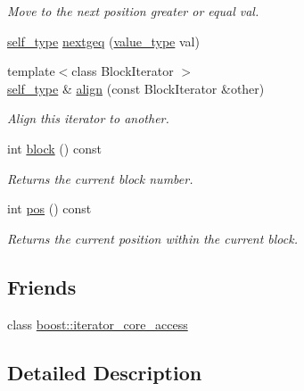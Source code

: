 \begin{DoxyCompactItemize}
\begin{DoxyCompactList}\small\item\em Move to the next position greater or equal {\ttfamily val}. \end{DoxyCompactList}\item 
\mbox{\hyperlink{classirk_1_1index_1_1block__iterator_a338ee8fee726492e9f8bbad4b4d75766}{self\+\_\+type}} \mbox{\hyperlink{classirk_1_1index_1_1block__iterator_aff7b154913783f7984e50c11efa10cb1}{nextgeq}} (\mbox{\hyperlink{classirk_1_1index_1_1block__iterator_a4d6c5b58cedd871e8a8f235e425e8587}{value\+\_\+type}} val)
\item 
{\footnotesize template$<$class Block\+Iterator $>$ }\\\mbox{\hyperlink{classirk_1_1index_1_1block__iterator_a338ee8fee726492e9f8bbad4b4d75766}{self\+\_\+type}} \& \mbox{\hyperlink{classirk_1_1index_1_1block__iterator_a901a557c429c737587e30b123bfc1641}{align}} (const Block\+Iterator \&other)
\begin{DoxyCompactList}\small\item\em Align this iterator to another. \end{DoxyCompactList}\item 
int \mbox{\hyperlink{classirk_1_1index_1_1block__iterator_afc0c06615fcd46d243bccd2a6a77ffeb}{block}} () const
\begin{DoxyCompactList}\small\item\em Returns the current block number. \end{DoxyCompactList}\item 
int \mbox{\hyperlink{classirk_1_1index_1_1block__iterator_a145b1a3e5f50d3eb0fc1135cda5f1253}{pos}} () const
\begin{DoxyCompactList}\small\item\em Returns the current position within the current block. \end{DoxyCompactList}\end{DoxyCompactItemize}
\subsection*{Friends}
\begin{DoxyCompactItemize}
\item 
class \mbox{\hyperlink{classirk_1_1index_1_1block__iterator_ac09f73e325921cc50ebcd96bed0f8096}{boost\+::iterator\+\_\+core\+\_\+access}}
\end{DoxyCompactItemize}


\subsection{Detailed Description}
